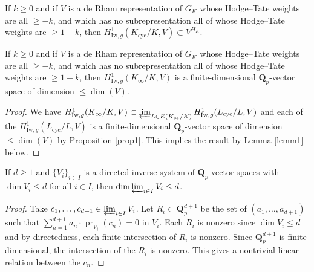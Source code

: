 \documentclass[12pt,english,a4paper]{smfart}
\newcommand{\Qp}{\mathbf{Q}_p}
\renewcommand{\projlim}{\varprojlim}
\newcommand{\Iw}{\mathrm{Iw}}
\newcommand{\cyc}{\mathrm{cyc}}
\newcommand{\pr}{\operatorname{pr}}
\begin{document}
\begin{prop}
\label{prop1}
If $k \geq 0$ and if $V$ is a de Rham representation of $G_K$ whose Hodge--Tate weights are all $\geq -k$, and which has no subrepresentation all of whose Hodge--Tate weights are $\geq 1-k$, then $H^1_{\Iw,g}(K_{\cyc}/K,V) \subset V^{H_K}$.
\end{prop}

\begin{coro}
\label{coro1}
If $k \geq 0$ and if $V$ is a de Rham representation of $G_K$ whose Hodge--Tate weights are all $\geq -k$, and which has no subrepresentation all of whose Hodge--Tate weights are $\geq 1-k$, then $H^1_{\Iw,g}(K_\infty/K,V)$ is a finite-dimensional $\Qp$-vector space of dimension $\leq \dim(V)$.
\end{coro}

\begin{proof}
We have $H^1_{\Iw,g}(K_\infty/K,V) \subset \projlim_{L \in E(K_\infty/K)} H^1_{\Iw,g}(L_{\cyc}/L,V)$ and each of the $H^1_{\Iw,g}(L_{\cyc}/L,V)$ is a finite-dimensional $\Qp$-vector space of dimension $\leq \dim(V)$ by Proposition \ref{prop1}. 
This implies the result by Lemma \ref{lemm1} below.
\end{proof}

\begin{lemm}
\label{lemm1}
If $d \geq 1$ and $\{ V_i \}_{i \in I }$ is a directed inverse system 
of $\Qp$-vector spaces with $\dim V_i \leq d$ for all $i \in I$, then $\dim \projlim_{i \in I} V_i \leq d$.
\end{lemm}

\begin{proof}
Take $c_1, \hdots, c_{d+1} \in \projlim_{i \in I} V_i$. Let $R_i \subset \Qp^{d+1}$ be the set of $(a_1,\hdots,a_{d+1})$ such that $\sum_{n=1}^{d+1} a_n  \cdot \pr_{V_i}(c_n) = 0$ in $V_i$. Each $R_i$ is nonzero since $\dim V_i \leq d$ and by directedness, each finite intersection of $R_i$ is nonzero. Since $\Qp^{d+1}$ is finite-dimensional, the intersection of the $R_i$  is nonzero. This gives a nontrivial linear relation between the $c_n$. 
\end{proof}
\end{document}
